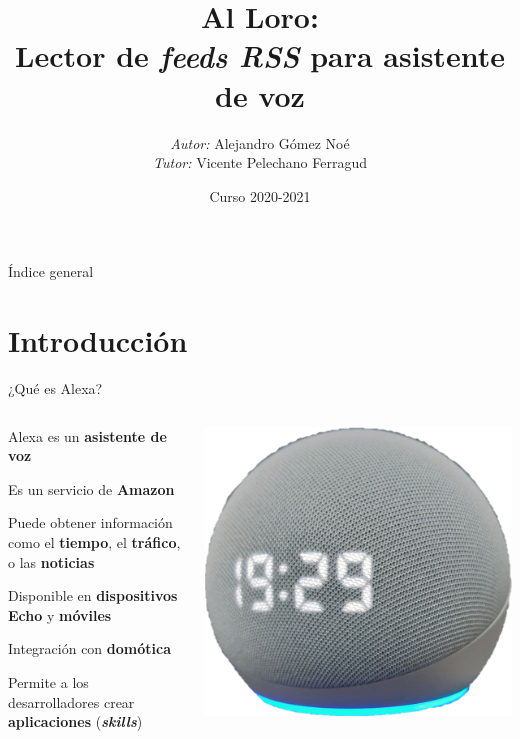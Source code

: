 \documentclass{beamer}
\title{Al Loro: \\Lector de \textit{feeds RSS} para asistente de voz}
\author[Alejandro Gómez Noé]{\emph{Autor:} Alejandro Gómez Noé\\[0.3em]\emph{Tutor:} Vicente Pelechano Ferragud}
\institute{ETSINF - Universidad Politécnica de Valencia}
\date{Curso 2020-2021}
\begin{document}
  
  \begin{frame}
    \titlepage
  \end{frame}
  
  \begin{frame}{Índice general}
    \tableofcontents
  \end{frame}

  \section{Introducción}
 
  \begin{frame}{¿Qué es Alexa?}
    \begin{columns}[c]
      \begin{column}{.51\textwidth}
        \begin{itemize}
          \setlength\itemsep{1.5em}
          {
          \item Alexa es un \textbf{asistente de voz}
          \item Es un servicio de \textbf{Amazon}
          \item Puede obtener información como el \textbf{tiempo}, el \textbf{tráfico}, o las \textbf{noticias}
          }
          {
          \item Disponible en \textbf{dispositivos Echo} y \textbf{móviles}
          \item Integración con \textbf{domótica}
          \item Permite a los desarrolladores crear \textbf{aplicaciones} (\textbf{\emph{skills}})
          }
        \end{itemize}
      \end{column}
      \begin{column}{.49\textwidth}
        {
          \includegraphics[width=.46\textwidth]{echo-dot.png}
}
\end{column}
\end{columns}
\end{frame}
\end{document}
